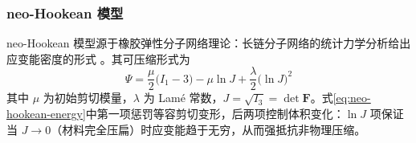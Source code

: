 \subsubsection{neo-Hookean 模型}

neo-Hookean 模型源于橡胶弹性分子网络理论：长链分子网络的统计力学分析给出应变能密度的形式 \cite{Treloar1943}。其可压缩形式为
\begin{equation}
  \Psi=\frac{\mu}{2}\bigl(I_1-3\bigr)-\mu\ln J+\frac{\lambda}{2}\bigl(\ln J\bigr)^{2}
  \label{eq:neo-hookean-energy}
\end{equation}
其中 $\mu$ 为初始剪切模量，$\lambda$ 为 Lam\'e 常数，$J=\sqrt{I_3}=\det\mathbf{F}$。式\eqref{eq:neo-hookean-energy}中第一项惩罚等容剪切变形，后两项控制体积变化：$\ln J$ 项保证当 $J\to0$（材料完全压扁）时应变能趋于无穷，从而强抵抗非物理压缩。

